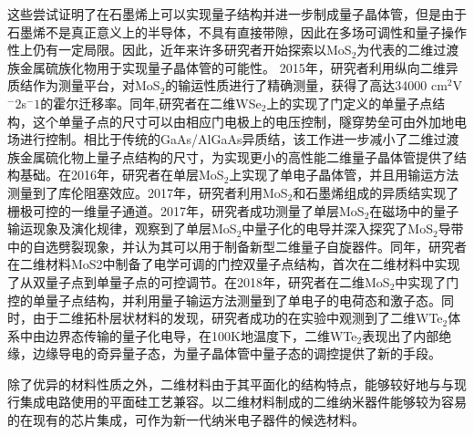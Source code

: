     这些尝试证明了在石墨烯上可以实现量子结构并进一步制成量子晶体管，但是由于石墨烯不是真正意义上的半导体，不具有直接带隙，因此在多场可调性和量子操作性上仍有一定局限。因此，近年来许多研究者开始探索以MoS$_2$为代表的二维过渡族金属硫族化物用于实现量子晶体管的可能性。
    2015年，研究者利用纵向二维异质结作为测量平台，对MoS$_2$的输运性质进行了精确测量，获得了高达34000 cm$^2$V$^-2$s$^-1$的霍尔迁移率。同年,研究者在二维WSe$_2$上的实现了门定义的单量子点结构，这个单量子点的尺寸可以由相应门电极上的电压控制，隧穿势垒可由外加地电场进行控制。相比于传统的GaAs/AlGaAs异质结，该工作进一步减小了二维过渡族金属硫化物上量子点结构的尺寸，为实现更小的高性能二维量子晶体管提供了结构基础。在2016年，研究者在单层MoS$_2$上实现了单电子晶体管，并且用输运方法测量到了库伦阻塞效应。2017年，研究者利用MoS$_2$和石墨烯组成的异质结实现了栅极可控的一维量子通道。2017年，研究者成功测量了单层MoS$_2$在磁场中的量子输运现象及演化规律，观察到了单层MoS$_2$中量子化的电导并深入探究了MoS$_2$导带中的自选劈裂现象，并认为其可以用于制备新型二维量子自旋器件。同年，研究者在二维材料MoS2中制备了电学可调的门控双量子点结构，首次在二维材料中实现了从双量子点到单量子点的可控调节。在2018年，研究者在二维MoS$_2$中实现了门控的单量子点结构，并利用量子输运方法测量到了单电子的电荷态和激子态。同时，由于二维拓朴层状材料的发现，研究者成功的在实验中观测到了二维WTe$_2$体系中由边界态传输的量子化电导，在100K地温度下，二维WTe$_2$表现出了内部绝缘，边缘导电的奇异量子态，为量子晶体管中量子态的调控提供了新的手段。

    除了优异的材料性质之外，二维材料由于其平面化的结构特点，能够较好地与与现行集成电路使用的平面硅工艺兼容。以二维材料制成的二维纳米器件能够较为容易的在现有的芯片集成，可作为新一代纳米电子器件的候选材料。

